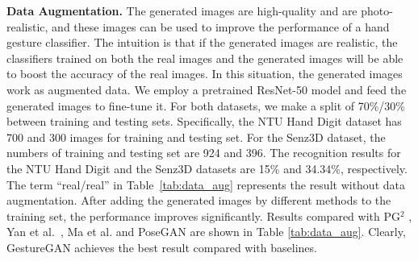 \documentclass[sigconf]{acmart}
\begin{document}
\noindent \textbf{Data Augmentation.}
The generated images are high-quality and are photo-realistic, and  these images can be used to improve the performance of a hand gesture classifier.
The intuition is that if the generated images are realistic, the classifiers trained on both the real images and the generated images will be able to boost the accuracy of the real images.
In this situation, the generated images work as augmented data.
We employ a pretrained ResNet-50 model \cite{he2016deep} and feed the generated images to fine-tune it. 
For both datasets, we make a split of 70\%/30\% between training and testing sets.
Specifically, the NTU Hand Digit dataset has 700 and 300 images for training and testing set.
For the Senz3D dataset, the numbers of training and testing set are 924 and 396. 
The recognition results for the NTU Hand Digit and the Senz3D datasets are 15\% and 34.34\%, respectively.
The term ``real/real'' in Table~\ref{tab:data_aug} represents the result without data augmentation.
After adding the generated images by different methods to the training set, the performance improves significantly.
Results compared with PG$^2$ \cite{ma2017pose}, Yan et al.~\cite{yan2017skeleton}, Ma et al. \cite{ma2017disentangled} and PoseGAN \cite{siarohin2017deformable}  are shown in Table \ref{tab:data_aug}.
Clearly, GestureGAN achieves the best result compared with baselines.


\begin{table}[!t]
	\centering
	\caption{Comparison of hand gesture recognition accuracy~(\%) on the NTU Hand Digit and Senz3D datasets.} 
	\label{tab:data_aug}
	\vspace{-0.15cm}
\end{table}
\end{document}

